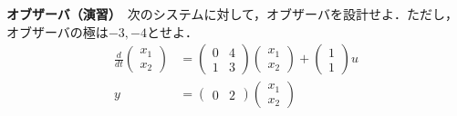 




\exheader

\noindent
{\bf オブザーバ（演習）}　次のシステムに対して，オブザーバを設計せよ．ただし，オブザーバの極は$-3,-4$とせよ．
\begin{align*}
	\frac{d}{dt}
	\left (
	\begin{array}{c}
	 x_1 \\ x_2 
	\end{array}
	\right )
	& = 
	\left (
	\begin{array}{cc}
	 0 & 4 \\
	 1 & 3
	\end{array}
	\right )
	\left (
	\begin{array}{c}
	 x_1 \\ x_2 
	\end{array}
	\right )
	+
	\left (
	\begin{array}{c}
	 1 \\ 1 
	\end{array}
	\right )
	u
\\
	y&=
	\left ( \begin{array}{cc}
		0 & 2 
	\end{array} \right )
	\left (	\begin{array}{c}
		x_1 \\ x_2 
	\end{array} \right )
\end{align*}


